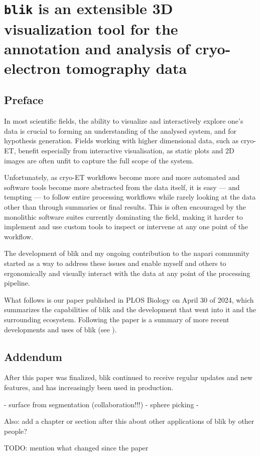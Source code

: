 \chapter[\texttt{blik}: a cryo-ET visualisation and analysis tool]{\texttt{blik} is an extensible 3D visualization tool for the annotation and analysis of cryo-electron tomography data}\label{blik}

\section{Preface}

In most scientific fields, the ability to visualize and interactively explore one's data is crucial to forming an understanding of the analysed system, and for hypothesis generation.
Fields working with higher dimensional data, such as cryo-ET, benefit especially from interactive visualisation, as static plots and 2D images are often unfit to capture the full scope of the system.

Unfortunately, as cryo-ET workflows become more and more automated and software tools become more abstracted from the data itself, it is easy --- and tempting --- to follow entire processing workflows while rarely looking at the data other than through summaries or final results.
This is often encouraged by the monolithic software suites currently dominating the field, making it harder to implement and use custom tools to inspect or intervene at any one point of the workflow.

The development of blik and my ongoing contribution to the napari community~\cite{thenaparicommunityNapariMultidimensionalImage-} started as a way to address these issues and enable myself and others to ergonomically and visually interact with the data at any point of the processing pipeline.

What follows is our paper published in PLOS Biology on April 30 of 2024, which summarizes the capabilities of blik and the development that went into it and the surrounding ecosystem.
Following the paper is a summary of more recent developments and uses of blik (see ).

\localtableofcontents  %



\section{Addendum}\label{blik_addendum}

After this paper was finalized, blik continued to receive regular updates and new features, and has increasingly been used in production.

- surface from segmentation (collaboration!!!)
- sphere picking
- 

Also: add a chapter or section after this about other applications of blik by other people?

TODO: mention what changed since the paper
